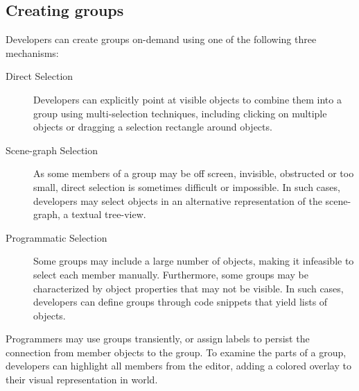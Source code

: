 \subsection{Creating groups}

Developers can create groups on-demand using one of the following
three mechanisms:
\begin{description}
\item[Direct Selection] Developers can explicitly point at visible
  objects to combine them into a group using multi-selection
  techniques, including clicking on multiple objects or dragging a
  selection rectangle around objects.
\item[Scene-graph Selection] As some members of a group may be off
  screen, invisible, obstructed or too small, direct selection is
  sometimes difficult or impossible. In such cases, developers may
  select objects in an alternative representation of the scene-graph,
  a textual tree-view.
\item[Programmatic Selection] Some groups may include a large number
  of objects, making it infeasible to select each member
  manually. Furthermore, some groups may be characterized by object
  properties that may not be visible. In such cases, developers can
  define groups through code snippets that yield lists of objects.
\end{description}

Programmers may use groups transiently, or assign labels to persist
the connection from member objects to the group. To examine the parts
of a group, developers can highlight all members from the editor,
adding a colored overlay to their visual representation in world.

